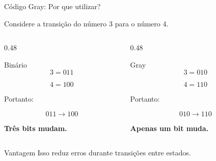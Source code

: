 \begin{frame}{Código Gray: Por que utilizar?}
    \small

    Considere a transição do número 3 para o número 4.

    \begin{columns}[T]

        \begin{column}{0.48\textwidth}

            \begin{block}{Binário}
                \[
                    3 = 011
                \]

                \[
                    4 = 100
                \]

                Portanto:

                \[
                    011 \rightarrow 100
                \]

                \textbf{Três bits mudam.}
            \end{block}

        \end{column}

        \begin{column}{0.48\textwidth}

            \begin{block}{Gray}
                \[
                    3 = 010
                \]

                \[
                    4 = 110
                \]

                Portanto:

                \[
                    010 \rightarrow 110
                \]

                \textbf{Apenas um bit muda.}
            \end{block}

        \end{column}

    \end{columns}

    \vspace{0.3cm}

    \begin{alertblock}{Vantagem}
        Isso reduz erros durante transições entre estados.
    \end{alertblock}

\end{frame}